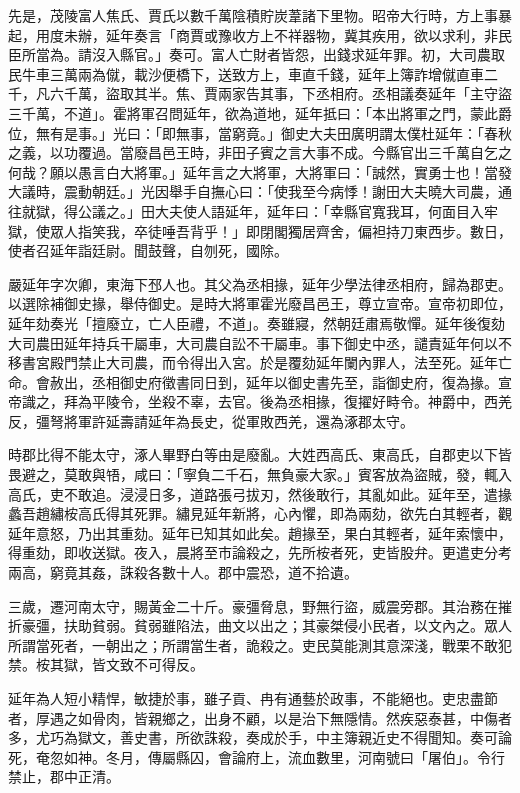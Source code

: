 \begin{pinyinscope}
先是，茂陵富人焦氏、賈氏以數千萬陰積貯炭葦諸下里物。昭帝大行時，方上事暴起，用度未辦，延年奏言「商賈或豫收方上不祥器物，冀其疾用，欲以求利，非民臣所當為。請沒入縣官。」奏可。富人亡財者皆怨，出錢求延年罪。初，大司農取民牛車三萬兩為僦，載沙便橋下，送致方上，車直千錢，延年上簿詐增僦直車二千，凡六千萬，盜取其半。焦、賈兩家告其事，下丞相府。丞相議奏延年「主守盜三千萬，不道」。霍將軍召問延年，欲為道地，延年抵曰：「本出將軍之門，蒙此爵位，無有是事。」光曰：「即無事，當窮竟。」御史大夫田廣明謂太僕杜延年：「春秋之義，以功覆過。當廢昌邑王時，非田子賓之言大事不成。今縣官出三千萬自乞之何哉？願以愚言白大將軍。」延年言之大將軍，大將軍曰：「誠然，實勇士也！當發大議時，震動朝廷。」光因舉手自撫心曰：「使我至今病悸！謝田大夫曉大司農，通往就獄，得公議之。」田大夫使人語延年，延年曰：「幸縣官寬我耳，何面目入牢獄，使眾人指笑我，卒徒唾吾背乎！」即閉閣獨居齊舍，偏袒持刀東西步。數日，使者召延年詣廷尉。聞鼓聲，自刎死，國除。

嚴延年字次卿，東海下邳人也。其父為丞相掾，延年少學法律丞相府，歸為郡吏。以選除補御史掾，舉侍御史。是時大將軍霍光廢昌邑王，尊立宣帝。宣帝初即位，延年劾奏光「擅廢立，亡人臣禮，不道」。奏雖寢，然朝廷肅焉敬憚。延年後復劾大司農田延年持兵干屬車，大司農自訟不干屬車。事下御史中丞，譴責延年何以不移書宮殿門禁止大司農，而令得出入宮。於是覆劾延年闌內罪人，法至死。延年亡命。會赦出，丞相御史府徵書同日到，延年以御史書先至，詣御史府，復為掾。宣帝識之，拜為平陵令，坐殺不辜，去官。後為丞相掾，復擢好畤令。神爵中，西羌反，彊弩將軍許延壽請延年為長史，從軍敗西羌，還為涿郡太守。

時郡比得不能太守，涿人畢野白等由是廢亂。大姓西高氏、東高氏，自郡吏以下皆畏避之，莫敢與啎，咸曰：「寧負二千石，無負豪大家。」賓客放為盜賊，發，輒入高氏，吏不敢追。浸浸日多，道路張弓拔刃，然後敢行，其亂如此。延年至，遣掾蠡吾趙繡桉高氏得其死罪。繡見延年新將，心內懼，即為兩劾，欲先白其輕者，觀延年意怒，乃出其重劾。延年已知其如此矣。趙掾至，果白其輕者，延年索懷中，得重劾，即收送獄。夜入，晨將至市論殺之，先所桉者死，吏皆股弁。更遣吏分考兩高，窮竟其姦，誅殺各數十人。郡中震恐，道不拾遺。

三歲，遷河南太守，賜黃金二十斤。豪彊脅息，野無行盜，威震旁郡。其治務在摧折豪彊，扶助貧弱。貧弱雖陷法，曲文以出之；其豪桀侵小民者，以文內之。眾人所謂當死者，一朝出之；所謂當生者，詭殺之。吏民莫能測其意深淺，戰栗不敢犯禁。桉其獄，皆文致不可得反。

延年為人短小精悍，敏捷於事，雖子貢、冉有通藝於政事，不能絕也。吏忠盡節者，厚遇之如骨肉，皆親鄉之，出身不顧，以是治下無隱情。然疾惡泰甚，中傷者多，尤巧為獄文，善史書，所欲誅殺，奏成於手，中主簿親近史不得聞知。奏可論死，奄忽如神。冬月，傳屬縣囚，會論府上，流血數里，河南號曰「屠伯」。令行禁止，郡中正清。


\end{pinyinscope}
